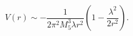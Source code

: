 \begin{equation}
\label{rev12}
V(r) \sim -\frac{1}{2\pi^2 M_5^3 \lambda r^2}
\left( 1 - \frac{\lambda^2}{2 r^2} \right).
\end{equation}

